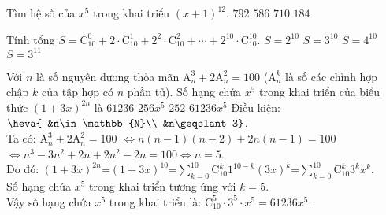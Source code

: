 \begin{ex}%
		Tìm hệ số của $x^5$ trong khai triển $(x+1)^{12}$.
		\choice
		{\True $792$}
		{$586$}
		{$710$}
		{$184$}
	\end{ex}%
\begin{ex}%
	Tính tổng $S=\mathrm{C}_{10}^{0}+2\cdot\mathrm{C}_{10}^{1}+2^2\cdot\mathrm{C}_{10}^{2}+\cdots+2^{10}\cdot\mathrm{C}_{10}^{10}$.
	\choice
	{$S=2^{10}$}
	{\True $S=3^{10}$}
	{$S=4^{10}$}
	{$S=3^{11}$}
\end{ex}%
\begin{ex} %
	Với $n$ là số nguyên dương thỏa mãn $\mathrm{A}_n^3+2\mathrm{A}_n^2=100$ ($\mathrm{A}_n^k$ là số các chỉnh hợp chập $k$ của tập hợp có $n$ phần tử). Số hạng chứa $x^5$ trong khai triển của biểu thức ${\left(1+3x\right)}^{2n}$ là
	\choice
	{$61236$}
	{$256x^5$}
	{$252$}
	{\True $61236x^5$}
	\loigiai
	{
		Điều kiện:
		$\heva{
			&n\in \mathbb{N}\\
			&n\geqslant 3}$.\\
		Ta có: $\mathrm{A}_n^3+2\mathrm{A}_n^2=100$
		$\Leftrightarrow n(n-1)(n-2)+2n(n-1)=100$
		$\Leftrightarrow n^3-3n^2+2n+2n^2-2n=100 \Leftrightarrow n=5$.\\
		Do đó: ${\left(1+3x\right)}^{2n}$=${\left(1+3x\right)}^{10}$=$\displaystyle\sum\limits_{k=0}^{10}{\mathrm{C}_{10}^k}1^{10-k}{\left(3x\right)}^k$=$\displaystyle\sum\limits_{k=0}^{10}{\mathrm{C}_{10}^k}3^kx^k$.\\
		Số hạng chứa $x^5$ trong khai triển tương ứng với $k=5$.\\
		Vậy số hạng chứa $x^5$ trong khai triển là: $\mathrm{C}_{10}^5 \cdot 3^5\cdot x^5=61236x^5.$
	}
\end{ex}%
